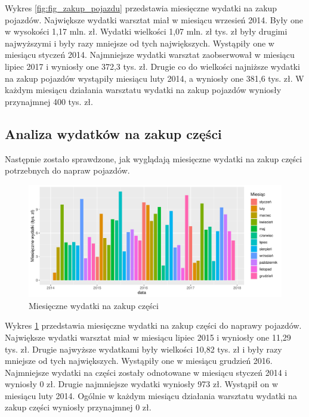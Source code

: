 \documentclass{article}\usepackage[]{graphicx}\usepackage[]{xcolor}
\makeatletter
\def\maxwidth{ %
  \ifdim\Gin@nat@width>\linewidth
    \linewidth
  \else
    \Gin@nat@width
  \fi
}
\newenvironment{knitrout}{}{} %
\makeatother
\begin{document}
Wykres \ref{fig:fig_zakup_pojazdu} przedstawia miesięczne wydatki na zakup pojazdów. 
Największe wydatki warsztat miał w miesiącu wrzesień 2014. Były one w wysokości 1,17 mln. zł. 
Wydatki wielkości 1,07 mln. zł tys. zł były drugimi najwyższymi i były  razy mniejsze od tych największych. Wystąpiły one w miesiącu styczeń 2014.
Najmniejsze wydatki warsztat zaobserwował w miesiącu lipiec 2017 i wyniosły one 372,3 tys. zł. 
Drugie co do wielkości najniższe wydatki na zakup pojazdów wystąpiły miesiącu luty 2014, a wyniosły one 381,6 tys. zł.
W każdym miesiącu działania warsztatu wydatki na zakup pojazdów wyniosły przynajmnej 400 tys. zł.

\subsection{Analiza wydatków na zakup części}

Następnie zostało sprawdzone, jak wyglądają miesięczne wydatki na zakup części potrzebnych do napraw pojazdów.

\begin{knitrout}
\color{fgcolor}\begin{figure}[H]

{\centering \includegraphics[width=\maxwidth]{figure/fig_zakup_czesci-1} 

}

\caption[Miesięczne wydatki na zakup części]{Miesięczne wydatki na zakup części}\label{fig:fig_zakup_czesci}
\end{figure}

\end{knitrout}

Wykres \ref{fig:fig_zakup_czesci} przedstawia miesięczne wydatki na zakup części do naprawy pojazdów.
Największe wydatki warsztat miał w miesiącu lipiec 2015 i wyniosły one 11,29 tys. zł. 
Drugie najwyższe wydatkami były wielkości 10,82 tys. zł i były  razy mniejsze od tych największych. Wystąpiły one w miesiącu grudzień 2016.
Najmniejsze wydatki na części zostały odnotowane w miesiącu styczeń 2014 i wyniosły 0 zł. 
Drugie najmniejsze wydatki wyniosły 973 zł. Wystąpił on w miesiącu luty 2014.
Ogólnie w każdym miesiącu działania warsztatu wydatki na zakup części wyniosły przynajmnej 0 zł.
\end{document}
